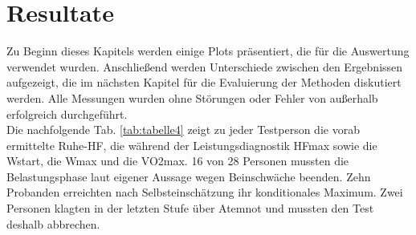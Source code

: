 \chapter{Resultate}
%
Zu Beginn dieses Kapitels werden einige Plots präsentiert, die für die Auswertung verwendet wurden. Anschließend werden Unterschiede zwischen den Ergebnissen aufgezeigt, die im nächsten Kapitel für die Evaluierung der Methoden diskutiert werden. Alle Messungen wurden ohne Störungen oder Fehler von außerhalb erfolgreich durchgeführt.\\
Die nachfolgende Tab. \ref{tab:tabelle4} zeigt zu jeder Testperson die vorab ermittelte Ruhe-\gls{HF}, die während der Leistungsdiagnostik \gls{HFmax} sowie die \gls{Wstart}, die \gls{Wmax} und die \acrfull{VO2max}. 16 von 28 Personen mussten die Belastungsphase laut eigener Aussage wegen Beinschwäche beenden. Zehn Probanden erreichten nach Selbsteinschätzung ihr konditionales Maximum. Zwei Personen klagten in der letzten Stufe über Atemnot und mussten den Test deshalb abbrechen.
%
